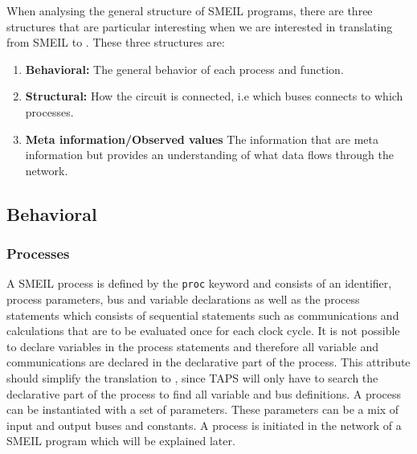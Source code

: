 When analysing the general structure of SMEIL programs, there are three structures that are particular interesting when we are interested in translating from SMEIL to \cspm{}. These three structures are:
\begin{enumerate}
    \item \textbf{Behavioral:} The general behavior of each process and function.
    \item \textbf{Structural:} How the circuit is connected, i.e which buses connects to which processes.
    \item \textbf{Meta information/Observed values} %
    The information that are meta information but provides an understanding of what data flows through the network.
\end{enumerate}


\subsection{Behavioral}

\subsubsection{Processes}

A SMEIL process is defined by the \texttt{proc} keyword and consists of an identifier, process parameters, bus and variable declarations as well as the process statements which consists of sequential statements such as communications and calculations that are to be evaluated once for each clock cycle.
It is not possible to declare variables in the process statements and therefore all variable and communications are declared in the declarative part of the process. This attribute should simplify the translation to \cspm, since TAPS will only have to search the declarative part of the process to find all variable and bus definitions.
A process can be instantiated with a set of parameters. These parameters can be a mix of input and output buses and constants. A process is initiated in the network of a SMEIL program which will be explained later.

